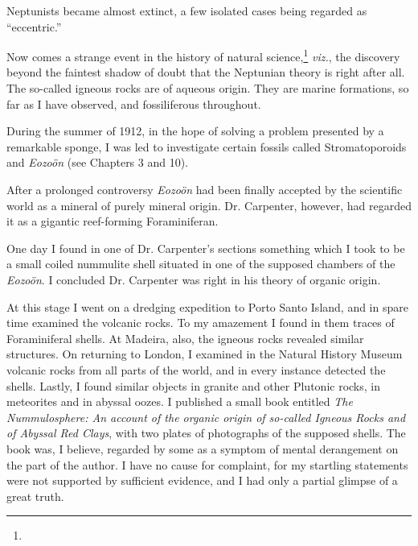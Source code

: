 \documentclass[a4paper, 12pt, oneside]{article}
\begin{document}
Neptunists became almost extinct, a few isolated cases being regarded as ``eccentric.''

Now comes a strange event in the history of natural science,\footnote{} \emph{viz.}, the discovery beyond the faintest shadow of doubt that the Neptunian theory is right after all. The so-called igneous rocks are of aqueous origin. They are marine formations, so far as I have observed, and fossiliferous throughout.

During the summer of 1912, in the hope of solving a problem presented by a remarkable sponge, I was led to investigate certain fossils called Stromatoporoids and \emph{Eozoön} (see Chapters 3 and 10).

After a prolonged controversy \emph{Eozoön} had been finally accepted by the scientific world as a mineral of purely mineral origin. Dr. Carpenter, however, had regarded it as a gigantic reef-forming Foraminiferan.

One day I found in one of Dr. Carpenter's sections something which I took to be a small coiled nummulite shell situated in one of the supposed chambers of the \emph{Eozoön}. I concluded Dr. Carpenter was right in his theory of organic origin.

At this stage I went on a dredging expedition to Porto Santo Island, and in spare time examined the volcanic rocks. To my amazement I found in them traces of Foraminiferal shells. At Madeira, also, the igneous rocks revealed similar structures. On returning to London, I examined in the Natural History Museum volcanic rocks from all parts of the world, and in every instance detected the shells. Lastly, I found similar objects in granite and other Plutonic rocks, in meteorites and in abyssal oozes. I published a small book entitled \emph{The Nummulosphere: An account of the organic origin of so-called Igneous Rocks and of Abyssal Red Clays}, with two plates of photographs of the supposed shells. The book was, I believe, regarded by some as a symptom of mental derangement on the part of the author. I have no cause for complaint, for my startling statements were not supported by sufficient evidence, and I had only a partial glimpse of a great truth.
\end{document}
